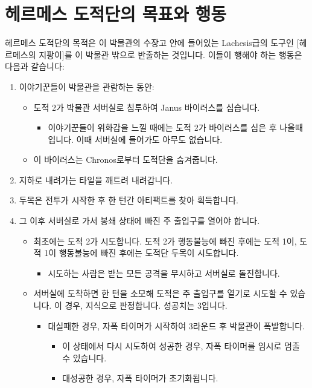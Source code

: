 \documentclass[12pt]{report}
\begin{document}
	\section*{헤르메스 도적단의 목표와 행동}
		헤르메스 도적단의 목적은 이 박물관의 수장고 안에 들어있는 Lachesis급의 도구인 [헤르메스의 지팡이]를 이 박물관 밖으로 반출하는 것입니다. 이들이 행해야 하는 행동은 다음과 같습니다:
		\begin{enumerate}
			\item 이야기꾼들이 박물관을 관람하는 동안:
			\begin{itemize}
				\item 도적 2가 박물관 서버실로 침투하여 Janus 바이러스를 심습니다.
				\begin{itemize}
					\item 이야기꾼들이 위화감을 느낄 때에는 도적 2가 바이러스를 심은 후 나올때입니다. 이때 서버실에 들어가도 아무도 없습니다.
				\end{itemize}
				\item 이 바이러스는 Chronos로부터 도적단을 숨겨줍니다.
			\end{itemize}
			\item 지하로 내려가는 타일을 깨트려 내려갑니다.
			\item 두목은 전투가 시작한 후 한 턴간 아티팩트를 찾아 획득합니다.
			\item 그 이후 서버실로 가서 봉쇄 상태에 빠진 주 출입구를 열어야 합니다.
			\begin{itemize}
				\item 최초에는 도적 2가 시도합니다. 도적 2가 행동불능에 빠진 후에는 도적 1이, 도적 1이 행동불능에 빠진 후에는 도적단 두목이 시도합니다.
				\begin{itemize}
					\item 시도하는 사람은 받는 모든 공격을 무시하고 서버실로 돌진합니다.
				\end{itemize}
				\item 서버실에 도착하면 한 턴을 소모해 도적은 주 출입구를 열기로 시도할 수 있습니다. 이 경우, 지식으로 판정합니다. 성공치는 3입니다.
				\begin{itemize}
					\item 대실패한 경우, 자폭 타이머가 시작하여 3라운드 후 박물관이 폭발합니다.
					\begin{itemize}
						\item 이 상태에서 다시 시도하여 성공한 경우, 자폭 타이머를 임시로 멈출 수 있습니다.
						\item 대성공한 경우, 자폭 타이머가 초기화됩니다.
					\end{itemize}

\end{itemize}
\end{itemize}
\end{enumerate}
\end{document}
